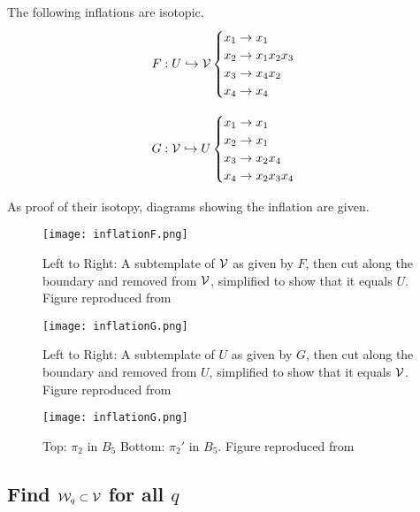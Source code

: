 \documentclass[paper.tex]{subfiles}
\begin{document}
\begin{prop}
    The following inflations are isotopic. 
$$F: U \hookrightarrow \mathcal{V} \begin{cases} x_1 \rightarrow x_1 \\ x_2 \rightarrow x_1 x_2 x_3 \\ x_3 \rightarrow x_4 x_2 \\ x_4 \rightarrow x_4 \end{cases}$$

$$G: \mathcal{V} \hookrightarrow U \begin{cases} x_1 \rightarrow x_1 \\ x_2 \rightarrow x_1 \\ x_3 \rightarrow x_2 x_4 \\ x_4 \rightarrow x_2 x_3 x_4 \end{cases}$$
\end{prop}

As proof of their isotopy, diagrams showing the inflation are given. 


\begin{figure}[h]
  \centering
  \texttt{[image: inflationF.png]}
  \caption{Left to Right: A subtemplate of $\mathcal{V}$ as given by $F$, then cut along the boundary and removed from $\mathcal{V}$, simplified to show that it equals $U$. Figure reproduced from~\cite{ghrist1997knots}}\label{fig:isotopicF}
\end{figure}

\begin{figure}[h]
  \centering
  \texttt{[image: inflationG.png]}
  \caption{Left to Right: A subtemplate of $U$ as given by $G$, then cut along the boundary and removed from $U$, simplified to show that it equals $\mathcal{V}$. Figure reproduced from~\cite{ghrist1997knots}}\label{fig:isotopicG}
\end{figure}



\begin{figure}[h]
  \centering
  \texttt{[image: inflationG.png]}
  \caption{Top: $\pi_2$ in $B_5$ Bottom: $\pi_2'$ in $B_5$. Figure reproduced from~\cite{Ghrist1996}}\label{fig:earexchange}
\end{figure}













\subsection{Find $\mathcal{W}_q \subset \mathcal{V}$ for all $q$}
\end{document}
